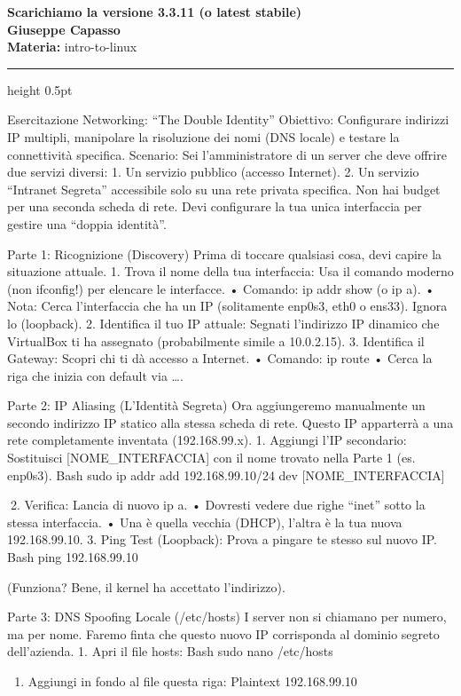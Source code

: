 \documentclass[11pt,a4paper]{article}
\providecommand{\tightlist}{%
  \setlength{\itemsep}{0pt}\setlength{\parskip}{0pt}}
\newcommand{\proposaltitle}[1]{
    \begin{center}
        \vspace*{0.1cm}
        {\LARGE \bfseries \color{blue} #1} \\[1.5ex]
        {\large \textbf{Giuseppe Capasso}} \\[1ex]
                \small{
            \vspace{0.1cm}
            \textbf{Materia:} intro-to-linux\\
        }
            \end{center}
    \vspace{0.3cm}
    \hrule height 0.5pt
    \vspace{0.5cm}
}
\begin{document}
\proposaltitle{Scarichiamo la versione 3.3.11 (o latest stabile)}

Esercitazione Networking: ``The Double Identity'' Obiettivo: Configurare
indirizzi IP multipli, manipolare la risoluzione dei nomi (DNS locale) e
testare la connettività specifica. Scenario: Sei l'amministratore di un
server che deve offrire due servizi diversi: 1. Un servizio pubblico
(accesso Internet). 2. Un servizio ``Intranet Segreta'' accessibile solo
su una rete privata specifica. Non hai budget per una seconda scheda di
rete. Devi configurare la tua unica interfaccia per gestire una ``doppia
identità''.

Parte 1: Ricognizione (Discovery) Prima di toccare qualsiasi cosa, devi
capire la situazione attuale. 1. Trova il nome della tua interfaccia:
Usa il comando moderno (non ifconfig!) per elencare le interfacce. •
Comando: ip addr show (o ip a). • Nota: Cerca l'interfaccia che ha un IP
(solitamente enp0s3, eth0 o ens33). Ignora lo (loopback). 2. Identifica
il tuo IP attuale: Segnati l'indirizzo IP dinamico che VirtualBox ti ha
assegnato (probabilmente simile a 10.0.2.15). 3. Identifica il Gateway:
Scopri chi ti dà accesso a Internet. • Comando: ip route • Cerca la riga
che inizia con default via \ldots.

Parte 2: IP Aliasing (L'Identità Segreta) Ora aggiungeremo manualmente
un secondo indirizzo IP statico alla stessa scheda di rete. Questo IP
apparterrà a una rete completamente inventata (192.168.99.x). 1.
Aggiungi l'IP secondario: Sostituisci {[}NOME\_INTERFACCIA{]} con il
nome trovato nella Parte 1 (es. enp0s3). Bash sudo ip addr add
192.168.99.10/24 dev {[}NOME\_INTERFACCIA{]}

2. Verifica: Lancia di nuovo ip a. • Dovresti vedere due righe ``inet''
sotto la stessa interfaccia. • Una è quella vecchia (DHCP), l'altra è la
tua nuova 192.168.99.10. 3. Ping Test (Loopback): Prova a pingare te
stesso sul nuovo IP. Bash ping 192.168.99.10

(Funziona? Bene, il kernel ha accettato l'indirizzo).

Parte 3: DNS Spoofing Locale (/etc/hosts) I server non si chiamano per
numero, ma per nome. Faremo finta che questo nuovo IP corrisponda al
dominio segreto dell'azienda. 1. Apri il file hosts: Bash sudo nano
/etc/hosts

\begin{enumerate}
\def\labelenumi{\arabic{enumi}.}
\setcounter{enumi}{1}
\tightlist
\item
  Aggiungi in fondo al file questa riga: Plaintext 192.168.99.10
\end{enumerate}
\end{document}
